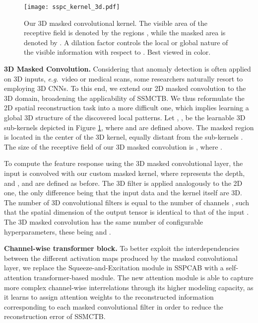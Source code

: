 \documentclass[10pt,journal,compsoc]{IEEEtran}
\newcommand{\eg}{\textit{e}.\textit{g}.}
\begin{document}
\begin{figure}[!t]
\begin{center}
\centerline{\texttt{[image: sspc\_kernel\_3d.pdf]}}
\vspace{-0.25cm}
\caption{Our 3D masked convolutional kernel. The visible area of the receptive field is denoted by the regions , while the masked area is denoted by . A dilation factor  controls the local or global nature of the visible information with respect to . Best viewed in color.}
\label{fig_kernel_3d}
\end{center}
\end{figure}

\noindent
\textbf{3D Masked Convolution.}
Considering that anomaly detection is often applied on 3D inputs, \eg~video or medical scans, some researchers naturally resort to employing 3D CNNs. To this end, we extend our 2D masked convolution to the 3D domain, broadening the applicability of SSMCTB. We thus reformulate the 2D spatial reconstruction task into a more difficult one, which implies learning a global 3D structure of the discovered local patterns. 
Let , , be the learnable 3D sub-kernels depicted in Figure \ref{fig_kernel_3d}, where  and  are defined above. The masked region  is located in the center of the 3D kernel, equally distant from the sub-kernels . The size of the receptive field of our 3D masked convolution is , where .  

To compute the feature response using the 3D masked convolutional layer, the input  is convolved with our custom masked kernel, where  represents the depth, and ,  and  are defined as before. The 3D filter is applied analogously to the 2D one, the only difference being that the input data and the kernel itself are 3D. The number of 3D convolutional filters is equal to the number of channels , such that the spatial dimension of the output tensor  is identical to that of the input . The 3D masked convolution has the same number of configurable hyperparameters, these being  and .

\noindent
\textbf{Channel-wise transformer block.}
To better exploit the interdependencies between the different activation maps produced by the masked convolutional layer, we replace the Squeeze-and-Excitation module in SSPCAB \cite{Ristea-CVPR-2022} with a self-attention transformer-based module. The new attention module is able to capture more complex channel-wise interrelations through its higher modeling capacity, as it learns to assign attention weights to the reconstructed information corresponding to each masked convolutional filter in order to reduce the reconstruction error of SSMCTB. 
\end{document}
